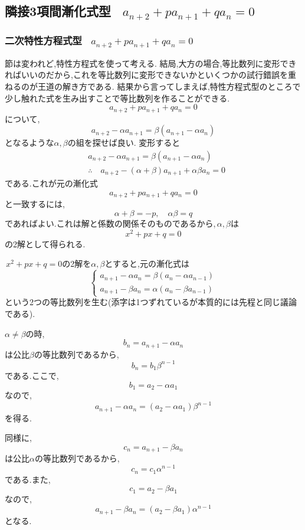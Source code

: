 
\subsection{隣接3項間漸化式型 \, $\displaystyle a_{n+2}+pa_{n+1}+qa_n=0$}
  \subsubsection{二次特性方程式型 \, $\displaystyle a_{n+2}+pa_{n+1}+qa_n=0$}
    節は変われど,特性方程式を使って考える.
    結局,大方の場合,等比数列に変形できればいいのだから,これを等比数列に変形できないかといくつかの試行錯誤を重ねるのが王道の解き方である.
    結果から言ってしまえば,特性方程式型のところで少し触れた式を生み出すことで等比数列を作ることができる.
    \[
      a_{n+2}+pa_{n+1}+qa_n=0
    \]
    について,
    \[
      a_{n+2}-\alpha a_{n+1}=\beta(a_{n+1}-\alpha a_{n})
    \]
    となるような$\alpha,\beta$の組を探せば良い.
    変形すると
    \begin{align*}
      &a_{n+2}-\alpha a_{n+1}=\beta(a_{n+1}-\alpha a_{n})\\
      &\therefore \quad a_{n+2}-(\alpha+\beta)a_{n+1}+\alpha\beta a_n=0
    \end{align*}
    である.これが元の漸化式
    \[
      a_{n+2}+pa_{n+1}+qa_n=0
    \]
    と一致するには,
    \[
      \alpha+\beta=-p,\quad \alpha\beta=q
    \]
    であればよい.これは解と係数の関係そのものであるから,\,$\alpha,\beta$は
    \[
      x^2+px+q=0
    \]
    の2解として得られる.

    \,$x^2+px+q=0$の2解を$\alpha,\beta$とすると,元の漸化式は
    \[
      \begin{cases}
        a_{n+1}-\alpha a_n=\beta(a_n-\alpha a_{n-1})\\
        a_{n+1}-\beta a_n=\alpha(a_n-\beta a_{n-1})
      \end{cases}
    \]
    という2つの等比数列を生む(添字は1つずれているが本質的には先程と同じ議論である).

    $\alpha\ne\beta$の時,
    \[
      b_n=a_{n+1}-\alpha a_n
    \]
    は公比$\beta$の等比数列であるから,
    \[
      b_n=b_1\beta^{n-1}
    \]
    である.ここで,
    \[
      b_1=a_2-\alpha a_1
    \]
    なので,
    \[
      a_{n+1}-\alpha a_n
      =(a_2-\alpha a_1)\beta^{n-1}
    \]
    を得る.

    同様に,
    \[
      c_n=a_{n+1}-\beta a_n
    \]
    は公比$\alpha$の等比数列であるから,
    \[
      c_n=c_1\alpha^{n-1}
    \]
    である.また,
    \[
      c_1=a_2-\beta a_1
    \]
    なので,
    \[
      a_{n+1}-\beta a_n
      =(a_2-\beta a_1)\alpha^{n-1}
    \]
    となる.

